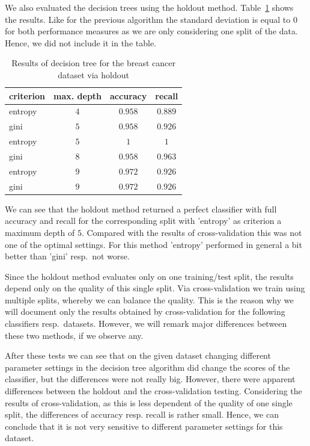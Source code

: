 \documentclass[a4paper,11pt]{article}
\begin{document}
        We also evaluated the decision trees using the holdout method. Table~\ref{tbl:decision-tree_breast-cancer_holdout} shows the results. Like for the previous algorithm the standard deviation is equal to $0$ for both performance measures as we are only considering one split of the data. Hence, we did not include it in the table.
        
        \begin{table}[h!]
            \centering
            \begin{tabular}[h]{l|c|c|c|}
                criterion & max. depth & accuracy & recall \\
                \hline
                entropy &$4$ & $0.958$ & $0.889$\\
                \hline
                gini & $5$ & $0.958$ & $0.926$\\\hline
                entropy & $5$ & $1$ & $1$\\\hline
                gini & $8$ & $0.958$ & $0.963$\\
                \hline
                entropy & $9$ & $0.972$ & $0.926$\\
                \hline
                gini & $9$ & $0.972$ & $0.926$\\
            \end{tabular}
            \caption{Results of decision tree for the breast cancer dataset via holdout}
            \label{tbl:decision-tree_breast-cancer_holdout}
        \end{table}
        
        We can see that the holdout method returned a perfect classifier with full accuracy and recall for the corresponding split with 'entropy' as criterion a maximum depth of $5$. Compared with the results of cross-validation this was not one of the optimal settings. For this method 'entropy' performed in general a bit better than 'gini' resp.\ not worse. 
        
        Since the holdout method evaluates only on one training/test split, the results depend only on the quality of this single split. Via cross-validation we train using multiple splits, whereby we can balance the quality. This is the reason why we will document only the results obtained by cross-validation for the following classifiers resp.\ datasets. However, we will remark major differences between these two methods, if we observe any.
        
        After these tests we can see that on the given dataset changing different parameter settings in the decision tree algorithm did change the scores of the classifier, but the differences were not really big. However, there were apparent differences between the holdout and the cross-validation testing. Considering the results of cross-validation, as this is less dependent of the quality of one single split, the differences of accuracy resp. recall is rather small. Hence, we can conclude that it is not very sensitive to different parameter settings for this dataset.
        
\end{document}
